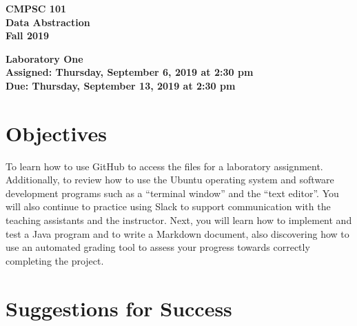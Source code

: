 \documentclass[11pt]{article}
\newcommand{\assignmentduedate}{September 13}
\newcommand{\assignmentassignedate}{September 6}
\newcommand{\assignmentnumber}{One}
\newcommand{\labyear}{2019}
\newcommand{\labday}{Thursday}
\newcommand{\labtime}{2:30 pm}
\newcommand{\assigneddate}{Assigned: \labday, \assignmentassignedate, \labyear{} at \labtime{}}
\newcommand{\duedate}{Due: \labday, \assignmentduedate, \labyear{} at \labtime{}}
\newcommand{\labtitle}[1]
{
  \begin{center}
    \begin{center}
      \bf
      CMPSC 101\\Data Abstraction\\
      Fall 2019\\
      \medskip
    \end{center}
    \bf
    #1
  \end{center}
}
\begin{document}
\thispagestyle{empty}

\labtitle{Laboratory \assignmentnumber{} \\ \assigneddate{} \\ \duedate{}}

\section*{Objectives}

To learn how to use GitHub to access the files for a laboratory assignment.
Additionally, to review how to use the Ubuntu operating system and software
development programs such as a ``terminal window'' and the ``text editor''. You
will also continue to practice using Slack to support communication with the
teaching assistants and the instructor. Next, you will learn how to implement
and test a Java program and to write a Markdown document, also discovering how
to use an automated grading tool to assess your progress towards correctly
completing the project.

\section*{Suggestions for Success}
\end{document}

